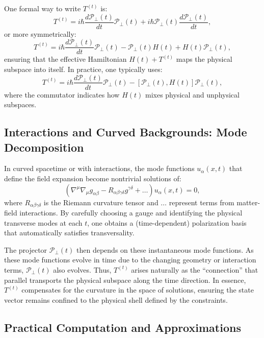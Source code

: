 \documentclass[aps,prl,twocolumn,showpacs,showkeys,superscriptaddress,amsmath,amssymb]{revtex4-2}
\begin{document}
One formal way to write $T^{(t)}$ is:
\begin{equation}
T^{(t)} = i\hbar \frac{d\mathcal{P}_\perp(t)}{dt}\mathcal{P}_\perp(t) + i\hbar \mathcal{P}_\perp(t)\frac{d\mathcal{P}_\perp(t)}{dt},
\end{equation}
or more symmetrically:
\begin{equation}
T^{(t)} = i\hbar \frac{d\mathcal{P}_\perp(t)}{dt}\mathcal{P}_\perp(t) - \mathcal{P}_\perp(t) H(t) + H(t)\mathcal{P}_\perp(t),
\end{equation}
ensuring that the effective Hamiltonian $H(t) + T^{(t)}$ maps the physical subspace into itself. In practice, one typically uses:
\begin{equation}
T^{(t)} = i\hbar \frac{d\mathcal{P}_\perp(t)}{dt}\mathcal{P}_\perp(t) - [\mathcal{P}_\perp(t),H(t)]\mathcal{P}_\perp(t),
\end{equation}
where the commutator indicates how $H(t)$ mixes physical and unphysical subspaces.

\subsection{Interactions and Curved Backgrounds: Mode Decomposition}

In curved spacetime or with interactions, the mode functions $u_{\alpha}(x,t)$ that define the field expansion become nontrivial solutions of:
\begin{equation}
(\nabla^\mu \nabla_\mu g_{\alpha\beta} - R_{\alpha\beta\gamma\delta}g^{\gamma\delta} + \ldots)u_{\alpha}(x,t) = 0,
\end{equation}
where $R_{\alpha\beta\gamma\delta}$ is the Riemann curvature tensor and $\ldots$ represent terms from matter-field interactions. By carefully choosing a gauge and identifying the physical transverse modes at each $t$, one obtains a (time-dependent) polarization basis that automatically satisfies transversality.

The projector $\mathcal{P}_\perp(t)$ then depends on these instantaneous mode functions. As these mode functions evolve in time due to the changing geometry or interaction terms, $\mathcal{P}_\perp(t)$ also evolves. Thus, $T^{(t)}$ arises naturally as the “connection” that parallel transports the physical subspace along the time direction. In essence, $T^{(t)}$ compensates for the curvature in the space of solutions, ensuring the state vector remains confined to the physical shell defined by the constraints.

\subsection{Practical Computation and Approximations}
\end{document}
